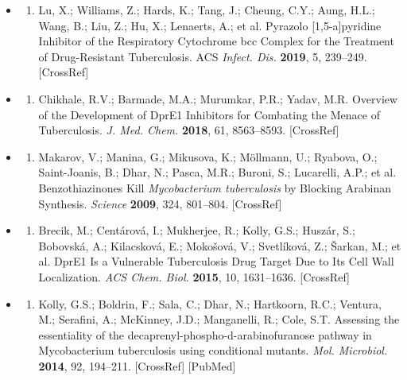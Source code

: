 \documentclass{article}
\begin{document}
\begin{itemize}
\begin{enumerate}
\end{enumerate}

\item \begin{enumerate}
\item 
Lu, X.; Williams, Z.; Hards, K.; Tang, J.; Cheung, C.Y.; Aung, H.L.; Wang, B.; Liu, Z.; Hu, X.; Lenaerts, A.; et al. Pyrazolo [1,5-a]pyridine Inhibitor of the Respiratory Cytochrome bcc Complex for the Treatment of Drug-Resistant Tuberculosis. ACS \textit{Infect. Dis.} \textbf{2019}, 5, 239–249. [CrossRef]

\end{enumerate}

\item \begin{enumerate}
\item 
Chikhale, R.V.; Barmade, M.A.; Murumkar, P.R.; Yadav, M.R. Overview of the Development of DprE1 Inhibitors for Combating the Menace of Tuberculosis. \textit{J. Med. Chem.} \textbf{2018}, 61, 8563–8593. [CrossRef]

\end{enumerate}

\item \begin{enumerate}
\item 
Makarov, V.; Manina, G.; Mikusova, K.; Möllmann, U.; Ryabova, O.; Saint-Joanis, B.; Dhar, N.; Pasca, M.R.; Buroni, S.; Lucarelli, A.P.; et al. Benzothiazinones Kill \textit{Mycobacterium tuberculosis} by Blocking Arabinan Synthesis. \textit{Science} \textbf{2009}, 324, 801–804. [CrossRef]

\end{enumerate}

\item \begin{enumerate}
\item 
Brecik, M.; Centárová, I.; Mukherjee, R.; Kolly, G.S.; Huszár, S.; Bobovská, A.; Kilacsková, E.; Mokošová, V.; Svetlíková, Z.; Šarkan, M.; et al. DprE1 Is a Vulnerable Tuberculosis Drug Target Due to Its Cell Wall Localization. \textit{ACS Chem. Biol.} \textbf{2015}, 10, 1631–1636. [CrossRef]

\end{enumerate}

\item \begin{enumerate}
\item 
Kolly, G.S.; Boldrin, F.; Sala, C.; Dhar, N.; Hartkoorn, R.C.; Ventura, M.; Serafini, A.; McKinney, J.D.; Manganelli, R.; Cole, S.T. Assessing the essentiality of the decaprenyl-phospho-d-arabinofuranose pathway in Mycobacterium tuberculosis using conditional mutants. \textit{Mol. Microbiol.} \textbf{2014}, 92, 194–211. [CrossRef] [PubMed]


\end{enumerate}
\end{itemize}
\end{document}

